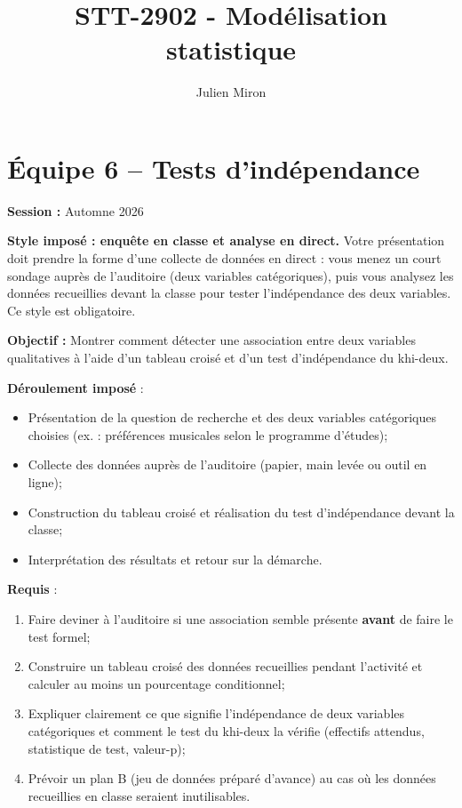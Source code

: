 \documentclass{article}
\title{STT-2902 - Modélisation statistique}
\author{Julien Miron}
\begin{document}
\section*{Équipe 6 – Tests d'indépendance}

\textbf{Session :} Automne 2026

\textbf{Style imposé : enquête en classe et analyse en direct.} Votre présentation doit prendre la forme d'une collecte de données en direct : vous menez un court sondage auprès de l'auditoire (deux variables catégoriques), puis vous analysez les données recueillies devant la classe pour tester l'indépendance des deux variables. Ce style est obligatoire.

\vspace{0.5cm}
\textbf{Objectif :} Montrer comment détecter une association entre deux variables qualitatives à l'aide d'un tableau croisé et d'un test d'indépendance du khi-deux.

\vspace{0.5cm}
\textbf{Déroulement imposé} :
\begin{itemize}
    \item Présentation de la question de recherche et des deux variables catégoriques choisies (ex. : préférences musicales selon le programme d'études);
    \item Collecte des données auprès de l'auditoire (papier, main levée ou outil en ligne);
    \item Construction du tableau croisé et réalisation du test d'indépendance devant la classe;
    \item Interprétation des résultats et retour sur la démarche.
\end{itemize}

\vspace{0.5cm}
\textbf{Requis} :
\begin{enumerate}
    \item Faire deviner à l'auditoire si une association semble présente \textbf{avant} de faire le test formel;
    \item Construire un tableau croisé des données recueillies pendant l'activité et calculer au moins un pourcentage conditionnel;
    \item Expliquer clairement ce que signifie l'indépendance de deux variables catégoriques et comment le test du khi-deux la vérifie (effectifs attendus, statistique de test, valeur-p);
    \item Prévoir un plan B (jeu de données préparé d'avance) au cas où les données recueillies en classe seraient inutilisables.
\end{enumerate}
\end{document}
